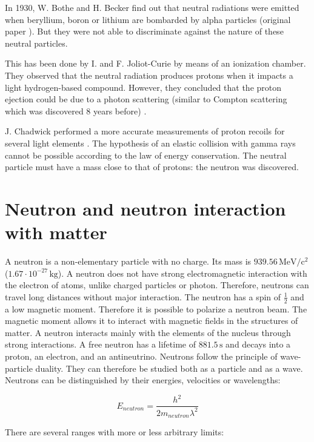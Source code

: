 \begin{refsection}
  In 1930, W. Bothe and H. Becker find out that neutral radiations were emitted when beryllium, boron or lithium are bombarded by alpha particles (original paper \cite{Bothe1930}). But they were not able to discriminate against the nature of these neutral particles.
  
  This has been done by I. and F. Joliot-Curie by means of an ionization chamber. They observed that the neutral radiation produces protons when it impacts a light hydrogen-based compound. However, they concluded that the proton ejection could be due to a photon scattering (similar to Compton scattering which was discovered 8 years before) \cite{curie:jpa-00233129}.

  J. Chadwick performed a more accurate measurements of proton recoils for several light elements \cite{Chadwick1932}. The hypothesis of an elastic collision with gamma rays cannot be possible according to the law of energy conservation. The neutral particle must have a mass close to that of protons: the neutron was discovered.

  \section{Neutron and neutron interaction with matter}
  \label{ch1:sec:Neutron}
  A neutron is a non-elementary particle with no charge. Its mass is $939.56\,\mathrm{MeV/c^{2}}$ ($1.67 \cdot 10^{-27}\,\mathrm{kg}$). A neutron does not have strong electromagnetic interaction with the electron of atoms, unlike charged particles or photon. Therefore, neutrons can travel long distances without major interaction. The neutron has a spin of $\frac{1}{2}$ and a low magnetic moment. Therefore it is possible to polarize a neutron beam. The magnetic moment allows it to interact with magnetic fields in the structures of matter. A neutron interacts mainly with the elements of the nucleus through strong interactions. A free neutron has a lifetime of $881.5\,\mathrm{s}$ and decays into a proton, an electron, and an antineutrino.
  Neutrons follow the principle of wave-particle duality. They can therefore be studied both as a particle and as a wave. Neutrons can be distinguished by their energies, velocities or wavelengths:

  \begin{equation*}
    E_{neutron} = \frac{h^{2}}{2m_{neutron}\lambda^{2}}
  \end{equation*}

  There are several ranges with more or less arbitrary limits:


\end{refsection}
